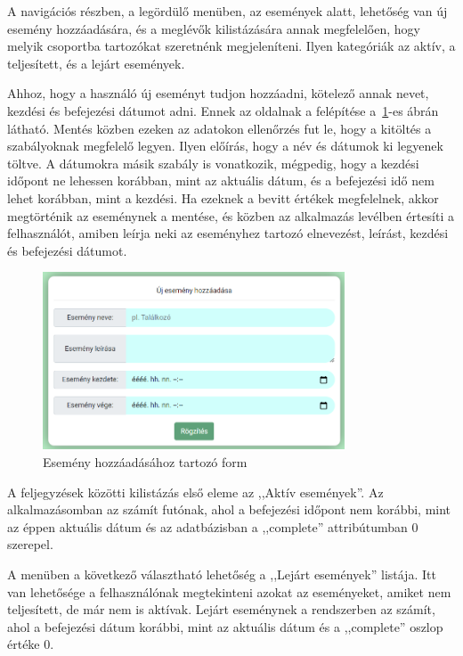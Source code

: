 \documentclass[
]{thesis-ekf}
\theoremstyle{definition}
\theoremstyle{remark}
\begin{document}
	A navigációs részben, a legördülő menüben, az események alatt, lehetőség van új esemény hozzáadására, és a meglévők kilistázására annak megfelelően, hogy melyik csoportba tartozókat szeretnénk megjeleníteni. Ilyen kategóriák az aktív, a teljesített, és a lejárt események. 
	
	Ahhoz, hogy a használó új eseményt tudjon hozzáadni, kötelező annak nevet, kezdési és befejezési dátumot adni. Ennek az oldalnak a felépítése a~\ref{figure:web_add_event}-es ábrán látható. Mentés közben ezeken az adatokon ellenőrzés fut le, hogy a kitöltés a szabályoknak megfelelő legyen. Ilyen előírás, hogy a név és dátumok ki legyenek töltve. A dátumokra másik szabály is vonatkozik, mégpedig, hogy a kezdési időpont ne lehessen korábban, mint az aktuális dátum, és a befejezési idő nem lehet korábban, mint a kezdési. Ha ezeknek a bevitt értékek megfelelnek, akkor megtörténik az eseménynek a mentése, és közben az alkalmazás levélben értesíti a felhasználót, amiben leírja neki az eseményhez tartozó elnevezést, leírást, kezdési és befejezési dátumot. 
	
	\begin{figure}[ht!]
		\centering
		\includegraphics[width=0.8\textwidth]{web_app/web_add_event}
		\caption{Esemény hozzáadásához tartozó form}
		\label{figure:web_add_event}
	\end{figure}
	
	A feljegyzések közötti kilistázás első eleme az ,,Aktív események''. Az alkalmazásomban az számít futónak, ahol a befejezési időpont nem korábbi, mint az éppen aktuális dátum és az adatbázisban a ,,complete''  attribútumban 0 szerepel.
	
	A menüben a következő választható lehetőség a ,,Lejárt események'' listája. Itt van lehetősége a felhasználónak megtekinteni azokat az eseményeket, amiket nem teljesített, de már nem is aktívak. Lejárt eseménynek a rendszerben az számít, ahol a befejezési dátum korábbi, mint az aktuális dátum és a ,,complete'' oszlop értéke 0. 
	
\end{document}
